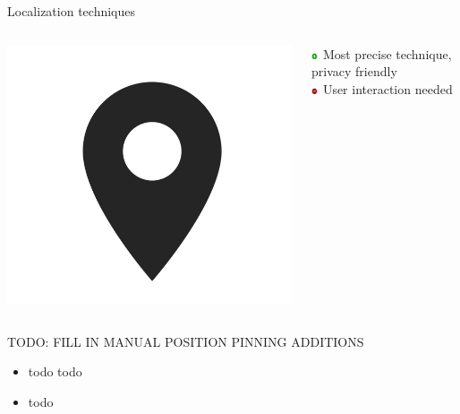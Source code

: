 \documentclass[11pt]{beamer}
\begin{document}
\begin{frame}[t]{Localization techniques}

  \begin{columns}[c]

    \begin{column}{0.2\textwidth}
      \includegraphics[width=\textwidth]{location-symbol}
    \end{column}

    \hfill

    \begin{column}{0.8\textwidth}

      \includegraphics[width=0.05\textwidth]{plus} Most precise technique, privacy friendly\\
      \includegraphics[width=0.05\textwidth]{minus} User interaction needed

    \end{column}

  \end{columns}

  TODO: FILL IN MANUAL POSITION PINNING ADDITIONS
  \begin{itemize}
    \setlength{\itemsep}{1pt}
    \setlength{\parskip}{0pt}
    \setlength{\parsep}{0pt}
    \item todo todo
    \item todo
  \end{itemize}

\end{frame}
\end{document}
